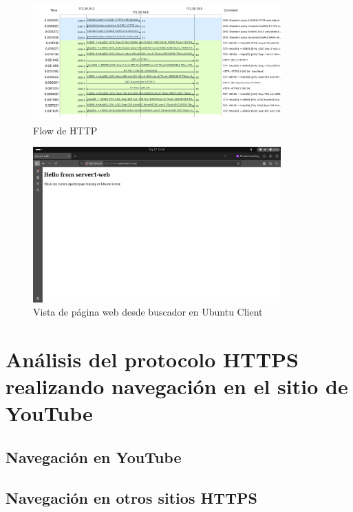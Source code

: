 \documentclass[10pt]{article}
\begin{document}
\begin{figure}[H]
    \centering
    \includegraphics[width=0.85\textwidth]{lab-02-screenshots/8.4-HTTP-flow}
    \caption{Flow de HTTP}
\end{figure}


\begin{figure}[H]
    \centering
    \includegraphics[width=0.85\textwidth]{lab-02-screenshots/8.4-web-browser}
    \caption{Vista de página web desde buscador en Ubuntu Client}
\end{figure}


\renewcommand{\thesection}{8.\arabic{section}}
\section{Análisis del protocolo HTTPS realizando navegación en el sitio de YouTube}
\subsection{Navegación en YouTube}
\subsection{Navegación en otros sitios HTTPS}
\end{document}
